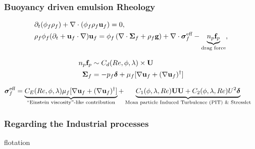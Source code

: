 \documentclass{sintefbeamer}
\begin{document}
\begin{frame}
  \frametitle{Buoyancy driven emulsion Rheology}
  \begin{align*}
    &\partial_t (\phi_f \rho_f)  
    + \mathbf{\nabla}\cdot (
        \phi_f \rho_f\textbf{u}_f
    )
    = 
    0,\\
    &
    \rho_f \phi_f(\partial_t 
    + \textbf{u}_f \cdot \mathbf{\nabla})
    \textbf{u}_f
    = \phi_f 
    \left(\mathbf{\nabla}\cdot \bm{\Sigma}_f
    + \rho_f \textbf{g}\right)
    + \mathbf{\nabla}\cdot  \bm{\sigma}_f^{\text{eff}}
    - \underbrace{n_p \textbf{f}_p}_\text{drag force},
  \end{align*}
  \pause
  
  \begin{align*}
    n_p \textbf{f}_p  
    &\sim 
    C_d(Re,\phi, \lambda) \times \textbf{U} \\
  \bm\Sigma_f &= - p_f \bm\delta + \mu_f [\mathbf{\nabla} \textbf{u}_f +  (\mathbf{\nabla} \textbf{u}_f)^\dagger ] 
  \end{align*}

\begin{align*}
    \bm{\sigma}^{\text{eff}}_f 
    &= \underbrace{C_E(Re,\phi,\lambda) \mu_f [\mathbf{\nabla} \textbf{u}_f +  (\mathbf{\nabla} \textbf{u}_f)^\dagger ] }_\text{``Einstein viscosity''-like contribution}
    + 
    \underbrace{
      C_1(\phi,\lambda,Re)\textbf{UU}
    + C_2(\phi,\lambda,Re)U^2 \bm\delta}_\text{Mean particle Induced Turbulence (PIT) \& Stresslet}
\end{align*}

\end{frame}


\begin{frame}
  \frametitle{Regarding the Industrial processes}

  flotation  

\end{frame}
\end{document}
